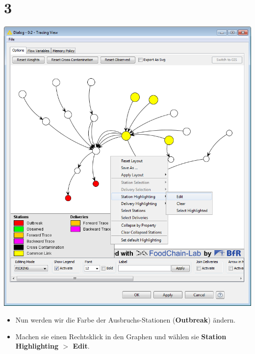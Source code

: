 \documentclass{beamer}
\begin{document}
\section{3}
\begin{frame}
	\begin{center}
  		\includegraphics[height=0.6\textheight]{3.png}
	\end{center}
	\begin{itemize}
		\item Nun werden wir die Farbe der Ausbruchs-Stationen (\textbf{Outbreak}) ändern.
		\item Machen sie einen Rechtsklick in den Graphen und wählen sie \textbf{Station Highlighting $>$ Edit}.
	\end{itemize}
\end{frame}
\end{document}
